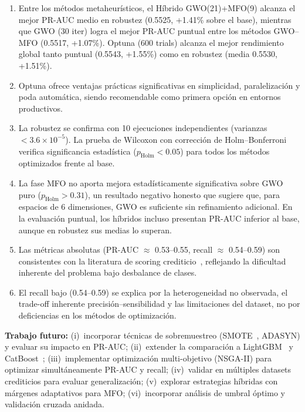 \documentclass[journal]{IEEEtran}
\begin{document}
\begin{enumerate}[leftmargin=*]
    \item Entre los métodos metaheurísticos, el Híbrido GWO(21)+MFO(9) alcanza el mejor PR-AUC medio en robustez (0.5525, +1.41\% sobre el base), mientras que GWO (30 iter) logra el mejor PR-AUC puntual entre los métodos GWO--MFO (0.5517, +1.07\%). Optuna (600 trials) alcanza el mejor rendimiento global tanto puntual (0.5543, +1.55\%) como en robustez (media 0.5530, +1.51\%).
    \item Optuna ofrece ventajas prácticas significativas en simplicidad, paralelización y poda automática, siendo recomendable como primera opción en entornos productivos.
    \item La robustez se confirma con 10 ejecuciones independientes (varianzas $< 3.6 \times 10^{-5}$). La prueba de Wilcoxon con corrección de Holm--Bonferroni verifica significancia estadística ($p_{\text{Holm}} < 0.05$) para todos los métodos optimizados frente al base.
    \item La fase MFO no aporta mejora estadísticamente significativa sobre GWO puro ($p_{\text{Holm}} > 0.31$), un resultado negativo honesto que sugiere que, para espacios de 6 dimensiones, GWO es suficiente sin refinamiento adicional. En la evaluación puntual, los híbridos incluso presentan PR-AUC inferior al base, aunque en robustez sus medias lo superan.
    \item Las métricas absolutas (PR-AUC ${\approx}$ 0.53--0.55, recall ${\approx}$ 0.54--0.59) son consistentes con la literatura de scoring crediticio~\cite{lessmann2015, thomas2000}, reflejando la dificultad inherente del problema bajo desbalance de clases.
    \item El recall bajo (0.54--0.59) se explica por la heterogeneidad no observada, el trade-off inherente precisión--sensibilidad y las limitaciones del dataset, no por deficiencias en los métodos de optimización.
\end{enumerate}



\textbf{Trabajo futuro:} (i)~incorporar técnicas de sobremuestreo (SMOTE~\cite{chawla2002}, ADASYN) y evaluar su impacto en PR-AUC; (ii)~extender la comparación a LightGBM~\cite{ke2017} y CatBoost~\cite{prokhorenkova2018}; (iii)~implementar optimización multi-objetivo (NSGA-II) para optimizar simultáneamente PR-AUC y recall; (iv)~validar en múltiples datasets crediticios para evaluar generalización; (v)~explorar estrategias híbridas con márgenes adaptativos para MFO; (vi)~incorporar análisis de umbral óptimo y validación cruzada anidada.
\end{document}
